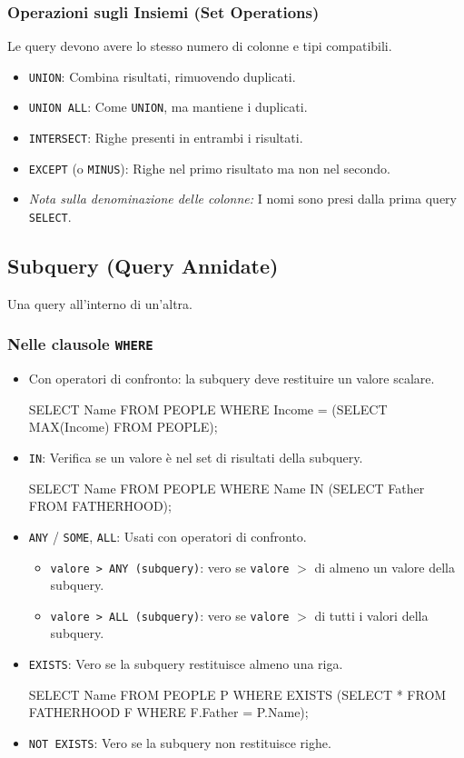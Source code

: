 \documentclass{article}
\begin{document}
	\subsubsection{Operazioni sugli Insiemi (Set Operations)}
	Le query devono avere lo stesso numero di colonne e tipi compatibili.
	\begin{itemize}
		\item \texttt{UNION}: Combina risultati, rimuovendo duplicati.
		\item \texttt{UNION ALL}: Come \texttt{UNION}, ma mantiene i duplicati.
		\item \texttt{INTERSECT}: Righe presenti in entrambi i risultati.
		\item \texttt{EXCEPT} (o \texttt{MINUS}): Righe nel primo risultato ma non nel secondo.
		\item \textit{Nota sulla denominazione delle colonne:} I nomi sono presi dalla prima query \texttt{SELECT}.
	\end{itemize}
	
	\subsection{Subquery (Query Annidate)}
	Una query all'interno di un'altra.
	
	\subsubsection{Nelle clausole \texttt{WHERE}}
	\begin{itemize}
		\item Con operatori di confronto: la subquery deve restituire un valore scalare.
		\begin{sqlcode}
			SELECT Name FROM PEOPLE WHERE Income = (SELECT MAX(Income) FROM PEOPLE);
		\end{sqlcode}
		\item \texttt{IN}: Verifica se un valore è nel set di risultati della subquery.
		\begin{sqlcode}
			SELECT Name FROM PEOPLE WHERE Name IN (SELECT Father FROM FATHERHOOD);
		\end{sqlcode}
		\item \texttt{ANY} / \texttt{SOME}, \texttt{ALL}: Usati con operatori di confronto.
		\begin{itemize}
			\item \texttt{valore > ANY (subquery)}: vero se \texttt{valore} $>$ di almeno un valore della subquery.
			\item \texttt{valore > ALL (subquery)}: vero se \texttt{valore} $>$ di tutti i valori della subquery.
		\end{itemize}
		\item \texttt{EXISTS}: Vero se la subquery restituisce almeno una riga.
		\begin{sqlcode}
			SELECT Name FROM PEOPLE P
			WHERE EXISTS (SELECT * FROM FATHERHOOD F WHERE F.Father = P.Name);
		\end{sqlcode}
		\item \texttt{NOT EXISTS}: Vero se la subquery non restituisce righe.
	\end{itemize}
	
\end{document}
